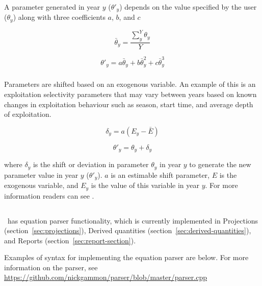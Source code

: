 A parameter generated in year $y$ ($\theta'_y$) depends on the value specified by the user ($\theta_y$) along with three coefficients $a$, $b$, and $c$

\begin{equation}
\bar{\theta}_y = \frac{\sum_{y}^Y\theta_y}{Y}
\end{equation}

\begin{equation}
\theta'_y = a \bar{\theta}_y + b\bar{\theta}_y^{2} + c\bar{\theta}_y^{3}
\end{equation}

\subsubsection[Exogenous]{}

Parameters are shifted based on an exogenous variable. An example of this is an exploitation selectivity parameters that may vary between years based on known changes in exploitation behaviour such as season, start time, and average depth of exploitation.

\begin{equation}
\delta_y = a(E_y - \bar{E})
\end{equation}

\begin{equation}
\theta'_y = \theta_y + \delta_y
\end{equation}

where $\delta_y$ is the shift or deviation in parameter $\theta_y$ in year $y$ to generate the new parameter value in year $y$ ($\theta'_y$). $a$ is an estimable shift parameter, $E$ is the exogenous variable, and $E_y$ is the value of this variable in year $y$. For more information readers can see \cite{francis_03}.

\subsection{\label{sec:eq_parser}}

\CNAME\ has equation parser functionality, which is currently implemented in Projections (section~\ref{sec:projections}), Derived quantities (section~\ref{sec:derived-quantities}), and Reports (section~\ref{sec:report-section}).

Examples of syntax for implementing the equation parser are below. For more information on the parser, see \url{https://github.com/nickgammon/parser/blob/master/parser.cpp}

